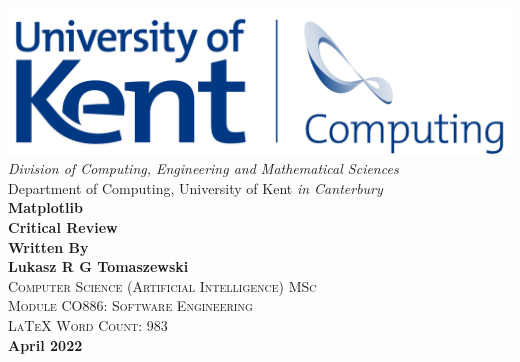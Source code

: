 \begin{titlepage}
\newcommand{\HRule}{\rule{\linewidth}{0.5mm}}
\begin{centering} 
\includegraphics[scale=0.95]{Media/uksc_logo.png} \\
\vspace{0.5cm} 
\large{\emph{Division of Computing, Engineering and Mathematical Sciences}} \\ [0.1cm]
\large{{Department of Computing, University of Kent \emph{in Canterbury}}} \\ [1.6cm]
\Huge{\bfseries{Matplotlib \\ Critical Review}} \\ [1.6cm]
{\Large{\bfseries{Written By \\ [0.2cm] \LARGE{Lukasz R G Tomaszewski}}}}\\%
\textsc{\Large Computer Science (Artificial Intelligence) MSc}\\ [0cm]
\textsc{\Large Module CO886: Software Engineering}\\ %
\textsc{\Large LaTeX Word Count: 983}\\ [1cm]
\textbf{\Large{April 2022}}\\
\end{centering} 
\end{titlepage}
